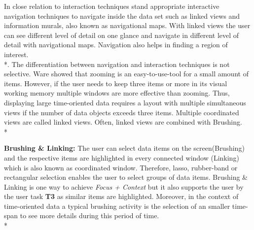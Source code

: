 In close relation to interaction techniques stand appropriate interactive navigation techniques to navigate inside the data set such as linked views and information murals, also known as navigational maps\cite{Jerding1998}. With linked views the user can see different level of detail on one glance and navigate in different level of detail with navigational maps. Navigation also helps in finding a region of interest.\\*. The differentiation between navigation and interaction techniques is not selective.
\label{zoomingVsmultiple}
Ware\cite{Ware2012} showed that zooming is an easy-to-use-tool for a small amount of items. However, if the user needs to keep three items or more in its visual working memory multiple windows are more effective than zooming. Thus, displaying large time-oriented data requires a layout with multiple simultaneous views if the number of data objects exceeds three items. Multiple coordinated views are called linked views. Often, linked views are combined with Brushing. \\*

\textbf{Brushing \& Linking: }The user can select data items on the screen(Brushing) and the respective items are highlighted in every connected window (Linking) which is also known as coordinated window. Therefore, lasso, rubber-band or rectangular selection enables the user to select groups of data items\cite{tegarden1999, Aigner2011}. Brushing \& Linking is one way to achieve \textit{Focus + Context} but it also supports the user by the user task \textbf{T3} as similar items are highlighted. Moreover, in the context of time-oriented data a typical brushing activity is the selection of an smaller time-span to see more details during this period of time. 
\\*

